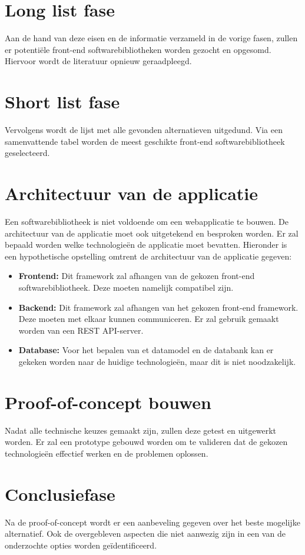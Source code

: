 \section {Long list fase}
Aan de hand van deze eisen en de informatie verzameld in de vorige fasen, zullen er potentiële front-end softwarebibliotheken worden gezocht en opgesomd. Hiervoor wordt de literatuur opnieuw geraadpleegd.

\section {Short list fase}
Vervolgens wordt de lijst met alle gevonden alternatieven uitgedund. Via een samenvattende tabel worden de meest geschikte front-end softwarebibliotheek geselecteerd.

\section{Architectuur van de applicatie}
Een softwarebibliotheek is niet voldoende om een webapplicatie te bouwen. De architectuur van de applicatie moet ook uitgetekend en besproken worden. Er zal bepaald worden welke technologieën de applicatie moet bevatten. Hieronder is een hypothetische opstelling omtrent de architectuur van de applicatie gegeven:

\begin{itemize} 
    \item \textbf{Frontend:} Dit framework zal afhangen van de gekozen front-end softwarebibliotheek. Deze moeten namelijk compatibel zijn.
    \item \textbf{Backend:} Dit framework zal afhangen van het gekozen front-end framework. Deze m\-oeten met elkaar kunnen communiceren. Er zal gebruik gemaakt worden van een REST API-server.
    \item \textbf{Database:} Voor het bepalen van et datamodel en de databank kan er gekeken worden naar de huidige technologieën, maar dit is niet noodzakelijk.
\end{itemize}

\section{Proof-of-concept bouwen}
Nadat alle technische keuzes gemaakt zijn, zu\-llen deze getest en uitgewerkt worden. Er zal een prototype gebouwd worden om te valideren dat de gekozen technologieën effectief werken en de problemen oplossen.

\section{Conclusiefase}
Na de proof-of-concept wordt er een aanbeveling gegeven over het beste mogelijke alternatief. Ook de overgebleven  aspecten die niet aanwezig zijn in een van de onderzochte opties worden geïdentificeerd.